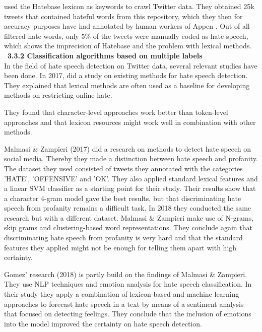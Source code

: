 \documentclass[a4paper,pdf]{article}
\begin{document}
\citet{Davidson2017AutomatedLanguage} used the Hatebase lexicon as keywords to crawl Twitter data. They obtained 25k tweets that contained hateful words from this repository, which they then for accuracy purposes have had annotated by human workers of Appen  \cite{Davidson2017AutomatedLanguage}. Out of all filtered hate words, only 5\% of the tweets were manually coded as hate speech, which shows the imprecision of Hatebase and the problem with lexical methods. \\
\break{}\
\textbf{3.3.2 Classification algorithms based on multiple labels}\\
\break{}
In the field of hate speech detection on Twitter data, several relevant studies have been done.  In 2017, \citet{SchmidtAProcessing} did a study on existing methods for hate speech detection. They explained that lexical methods are often used as a baseline for developing methods on restricting online hate. 

They found that character-level approaches work better than token-level approaches and that lexicon resources might work well in combination with other methods. 

Malmasi \& Zampieri (2017) did a research on methods to detect hate speech on social media. Thereby they made a distinction between hate speech and profanity. The dataset they used consisted of tweets they annotated with the categories 'HATE', 'OFFENSIVE' and 'OK'. They also applied standard lexical features and a linear SVM classifier as a starting point for their study. Their results show that a character 4-gram model gave the best results, but that discriminating hate speech from profanity remains a difficult task. In 2018 they conducted the same research but with a different dataset. Malmasi \& Zampieri make use of N-grams, skip grams and clustering-based word representations. They conclude again that discriminating hate speech from profanity is very hard and that the standard features they applied might not be enough for telling them apart with high certainty.

Gomez' research (2018) is partly build on the findings of Malmasi \& Zampieri. They use NLP techniques and emotion analysis for hate speech classification. In their study they apply a combination of lexicon-based and machine learning approaches to forecast hate speech in a text by means of a sentiment analysis that focused on detecting feelings. They conclude that the inclusion of emotions into the model improved the certainty on hate speech detection.\\
\end{document}
